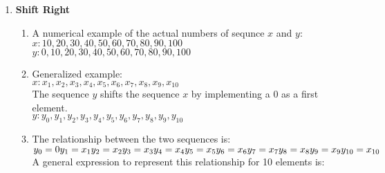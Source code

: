 \documentclass[letterpaper, 24pt, final, onecolumn, titlepage] {article}
\begin{document}
\begin {enumerate}
\begin{enumerate}
				$x:x_1,x_2,x_3,...,x_{n-2},x_{n-1},x_n$\\
				$y:y_1,y_2,y_3,....,y_{n-2},y_{n-1},y_n$\\
				Each Element of $y$ can  be written i terms of $x$:\\
				 $y_1=x_3\\
				 y_2=x_6\\
				 ...\\
			 	y_{n-2}=x_{3n-6}\\
				 y_{n-1}=x_{3n-3}\\
				 y_n=x_{3n}$\\
 				 A general expression to represent this relationship for $n$ elements is:\\
				 $y_i=x_{3i}$\hspace{10mm}$i=1,2,....,n\\$
		\end{enumerate}
	\item \textbf{Shift Right}
		\begin{enumerate}
			\item A numerical example of the actual numbers of sequnce $x$ and $y$:\\
				$x:10,20,30,40,50,60,70,80,90,100$\\
				$y:0,10,20,30,40,50,60,70,80,90,100$\\
			\item Generalized example:\\
				$x:x_1,x_2,x_3,x_4,x_5,x_6,x_7,x_8,x_9,x_{10}$\\
				The sequence $y$ shifts the sequence $x$ by implementing a 0 as a first element.\\
				$y:y_0,y_1,y_2,y_3,y_4,y_5,y_6,y_7,y_8,y_9,y_{10}$\\
			\item The relationship between the two sequences is:\\
				$y_0=0\\
				 y_1=x_1\\
				 y_2=x_2\\
				 y_3=x_3\\
			 	 y_4=x_4\\
				 y_5=x_5\\
				 y_6=x_6\\
				 y_7=x_7\\
			 	 y_8=x_8\\
				 y_9=x_9\\
				 y_{10}=x_{10}$\\
				 A general expression to represent this relationship for 10 elements is:\\

\end{enumerate}
\end{enumerate}
\end{document}

